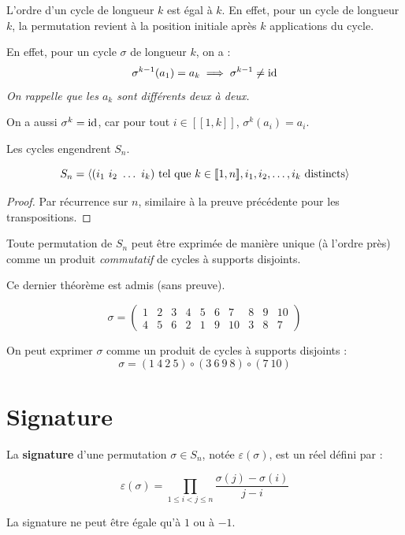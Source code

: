 \documentclass[12pt, a4paper]{report}
\begin{document}
\begin{remark}
    L'ordre d'un cycle de longueur $k$ est égal à $k$. En effet, pour un cycle de longueur $k$, la permutation revient à la position initiale après $k$ applications du cycle.

    En effet, pour un cycle $\sigma$ de longueur $k$, on a :
    $$\sigma^{k-1}(a_1) = a_k \implies \sigma^{k-1} \ne \mathrm{id}$$
    \textit{On rappelle que les $a_k$ sont différents deux à deux.}

    On a aussi $\sigma^k = \mathrm{id}$, car pour tout $i \in [\![1,k]\!]$, $\sigma^k(a_i) = a_i$.
\end{remark}

\begin{theorem}
    Les cycles engendrent $S_n$.
    
    $$S_n = \langle (i_1 \ i_2 \ \dots \ i_k) \text{ tel que } k \in [\![1,n]\!], i_1, i_2, \dots, i_k \text{ distincts} \rangle$$
\end{theorem}

\begin{proof}
    Par récurrence sur $n$, similaire à la preuve précédente pour les transpositions.
\end{proof}

\begin{theorem}
    Toute permutation de $S_n$ peut être exprimée de manière unique (à l'ordre près) comme un produit \textit{commutatif} de cycles à supports disjoints.
\end{theorem}

Ce dernier théorème est admis (sans preuve).

\begin{example}
    $$\sigma = \left(\begin{matrix} 1 & 2 & 3 & 4 & 5 & 6 & 7 & 8 & 9 & 10 \\ 4 & 5 & 6 & 2 & 1 & 9 & 10 & 3 & 8 & 7 \end{matrix}\right)$$

    On peut exprimer $\sigma$ comme un produit de cycles à supports disjoints :
    $$\sigma = (1 \ 4 \ 2 \ 5)\circ(3 \ 6 \ 9 \ 8)\circ(7 \ 10)$$
\end{example}

\section{Signature}

\begin{definition}
    La \textbf{signature} d'une permutation $\sigma \in S_n$, notée $\varepsilon(\sigma)$, est un réel défini par :

    $$\varepsilon(\sigma) = \prod_{1 \le i < j \le n} \frac{\sigma(j) - \sigma(i)}{j - i}$$

    La signature ne peut être égale qu'à $1$ ou à $-1$.
\end{definition}
\end{document}
